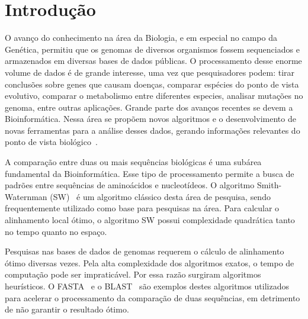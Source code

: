\documentclass[12pt, a4paper]{article}
\numberwithin{table}{section}
\begin{document}
\section{Introdução}
\label{sec:introducao}



O avanço do conhecimento na área da Biologia, e em especial no campo da Genética, permitiu que
os genomas de diversos organismos fossem sequenciados e armazenados em diversas 
bases de dados públicas. O processamento desse enorme volume de 
dados é de grande interesse, uma vez que pesquisadores podem: tirar conclusões sobre 
genes que causam doenças, comparar espécies do ponto de vista evolutivo, comparar 
o metabolismo entre diferentes especies, analisar mutações no genoma, entre 
outras aplicações. Grande parte dos avanços recentes se devem a Bioinformática. Nessa área se 
propõem novos algoritmos e o desenvolvimento de novas ferramentas para a análise
desses dados, gerando informações relevantes do ponto de vista 
biológico~\cite{Luscombe2001WhatIB}.

A comparação entre duas ou mais sequências biológicas é uma subárea fundamental
da Bioinformática. Esse tipo de processamento permite a busca de padrões 
entre sequências de aminoácidos e nucleotídeos. O algoritmo
Smith-Waternman (SW)~\cite{SMITH1981195} é um algoritmo clássico desta área 
de pesquisa, sendo frequentemente utilizado como base para 
pesquisas na área. Para  calcular o alinhamento local ótimo,
o algoritmo SW possui complexidade quadrática tanto no tempo quanto no espaço.

Pesquisas nas bases de dados de genomas requerem o cálculo de alinhamento ótimo 
diversas vezes. Pela alta complexidade dos algoritmos exatos, o tempo de 
computação pode ser impraticável. Por essa razão surgiram algoritmos heurísticos. 
O FASTA~\cite{PMID:3162770} e o BLAST~\cite{ALTSCHUL1990403} são exemplos destes algoritmos utilizados para acelerar o processamento da comparação de duas sequências, em detrimento de não 
garantir o resultado ótimo. 
\end{document}
